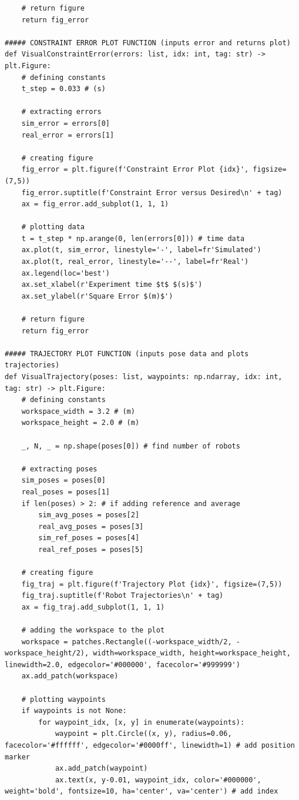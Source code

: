 \documentclass[11pt]{article}
\begin{document}
\begin{verbatim}
    # return figure
    return fig_error

##### CONSTRAINT ERROR PLOT FUNCTION (inputs error and returns plot)
def VisualConstraintError(errors: list, idx: int, tag: str) -> plt.Figure:
    # defining constants
    t_step = 0.033 # (s)

    # extracting errors
    sim_error = errors[0]
    real_error = errors[1]

    # creating figure
    fig_error = plt.figure(f'Constraint Error Plot {idx}', figsize=(7,5))
    fig_error.suptitle(f'Constraint Error versus Desired\n' + tag)
    ax = fig_error.add_subplot(1, 1, 1)

    # plotting data
    t = t_step * np.arange(0, len(errors[0])) # time data
    ax.plot(t, sim_error, linestyle='-', label=fr'Simulated')
    ax.plot(t, real_error, linestyle='--', label=fr'Real')
    ax.legend(loc='best')
    ax.set_xlabel(r'Experiment time $t$ $(s)$')
    ax.set_ylabel(r'Square Error $(m)$')

    # return figure
    return fig_error

##### TRAJECTORY PLOT FUNCTION (inputs pose data and plots trajectories)
def VisualTrajectory(poses: list, waypoints: np.ndarray, idx: int, tag: str) -> plt.Figure:
    # defining constants
    workspace_width = 3.2 # (m)
    workspace_height = 2.0 # (m)

    _, N, _ = np.shape(poses[0]) # find number of robots

    # extracting poses
    sim_poses = poses[0]
    real_poses = poses[1]
    if len(poses) > 2: # if adding reference and average
        sim_avg_poses = poses[2]
        real_avg_poses = poses[3]
        sim_ref_poses = poses[4]
        real_ref_poses = poses[5]

    # creating figure
    fig_traj = plt.figure(f'Trajectory Plot {idx}', figsize=(7,5))
    fig_traj.suptitle(f'Robot Trajectories\n' + tag)
    ax = fig_traj.add_subplot(1, 1, 1)

    # adding the workspace to the plot
    workspace = patches.Rectangle((-workspace_width/2, -workspace_height/2), width=workspace_width, height=workspace_height, linewidth=2.0, edgecolor='#000000', facecolor='#999999')
    ax.add_patch(workspace)

    # plotting waypoints
    if waypoints is not None:
        for waypoint_idx, [x, y] in enumerate(waypoints):
            waypoint = plt.Circle((x, y), radius=0.06, facecolor='#ffffff', edgecolor='#0000ff', linewidth=1) # add position marker
            ax.add_patch(waypoint)
            ax.text(x, y-0.01, waypoint_idx, color='#000000', weight='bold', fontsize=10, ha='center', va='center') # add index


\end{verbatim}
\end{document}
